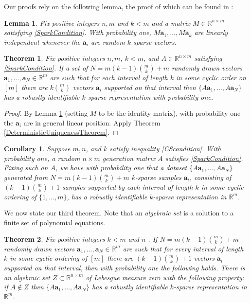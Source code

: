 \documentclass[journal, onecolumn]{IEEEtran}
\newtheorem{theorem}{Theorem}
\newtheorem{lemma}{Lemma}
\newtheorem{corollary}{Corollary}
\begin{document}
Our proofs rely on the following lemma, the proof of which can be found in \cite[Lemma 3]{Hillar15}:
\begin{lemma}\label{Hillar15lemma2}
Fix positive integers $n, m$ and $k < m$ and a matrix $M \in \mathbb{R}^{n \times m}$ satisfying \eqref{SparkCondition}. With probability one, $M\mathbf{a}_1, \ldots, M\mathbf{a}_k$ are linearly independent whenever the $\mathbf{a}_i$ are random $k$-sparse vectors.
\end{lemma}

\begin{theorem}\label{Theorem2}
Fix positive integers $n, m$, $k < m$, and $A \in \mathbb{R}^{n \times m}$ satisfying \eqref{SparkCondition}. If a set of $N = m(k-1){m \choose k}+m$ randomly drawn vectors $\mathbf{a}_1, \ldots, \mathbf{a}_N \in \mathbb{R}^m$ are such that for each interval of length $k$ in some cyclic order on $[m]$ there are $k{m \choose k}$ vectors $\mathbf{a}_i$ supported on that interval then $\{A\mathbf{a}_1, \ldots, A\mathbf{a}_N\}$ has a robustly identifiable $k$-sparse representation with probability one.
\end{theorem}

\begin{proof}
By Lemma \ref{Hillar15lemma2} (setting $M$ to be the identity matrix), with probability one the $\mathbf{a}_i$ are in general linear position. Apply Theorem \ref{DeterministicUniquenessTheorem}.
\end{proof} 

\begin{corollary}
Suppose $m, n$, and $k$ satisfy inequality \eqref{CScondition}. With probability one, a random $n \times m$ generation matrix $A$ satisfies \eqref{SparkCondition}. Fixing such an $A$, we have with probability one that a dataset $\{A\mathbf{a}_1, \ldots , A\mathbf{a}_N\}$ generated from $N = m(k-1){m \choose k}+m$ $k$-sparse samples $\mathbf{a}_i$, consisting of $(k-1){m \choose k}+1$ samples supported by each interval of length $k$ in some cyclic ordering of $\{1, \ldots, m\}$, has a robustly identifiable $k$-sparse representation in $\mathbb{R}^m$.
\end{corollary}
We now state our third theorem. Note that an \emph{algebraic set} is a solution to a finite set of polynomial equations. 

\begin{theorem}\label{Theorem3}
Fix positive integers $k < m$ and $n$ . If $N = m(k-1){m \choose k}+m$ randomly drawn vectors $\mathbf{a}_1, \ldots, \mathbf{a}_N \in \mathbb{R}^m$ are such that for every interval of length $k$ in some cyclic ordering of $[m]$ there are $(k-1){m \choose k}+1$ vectors $\mathbf{a}_i$ supported on that interval, then with probability one the following holds. There is an algebraic set $Z \subset \mathbb{R}^{n \times m}$ of Lebesgue measure zero with the following property: if $A \notin Z$ then $\{A\mathbf{a}_1, \ldots , A\mathbf{a}_N \}$ has a robustly identifiable $k$-sparse representation in $\mathbb{R}^m$.
\end{theorem}
\end{document}
